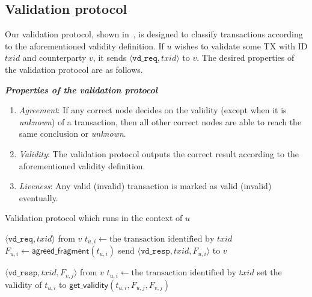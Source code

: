 \subsection{Validation protocol}
Our validation protocol,
shown in~,
is designed to classify transactions according to the aforementioned validity definition.
If $u$ wishes to validate some TX with ID $txid$ and counterparty $v$, it sends $\langle \texttt{vd\_req}, txid \rangle$ to $v$.
The desired properties of the validation protocol are as follows.
\begin{definition}
\label{def:validation}
\textbf{\emph{Properties of the validation protocol}}

\begin{enumerate}
    \item \emph{Agreement}:
        If any correct node decides on the validity (except when it is \emph{unknown}) of a transaction,
        then all other correct nodes are able to reach the same conclusion or \emph{unknown}.
    \item \emph{Validity}:
        The validation protocol outputs the correct result
        according to the aforementioned validity definition.
    \item \emph{Liveness}:
        Any valid (invalid) transaction is marked as valid (invalid) eventually.
\end{enumerate}
\end{definition}

\begin{algorithm}
\caption{Validation protocol which runs in the context of $u$}
\label{alg:vd-proto}

\begin{algorithmic}
    \Upon $\langle \texttt{vd\_req}, txid \rangle$ from $v$
        \State $t_{u, i} \gets \text{the transaction identified by } txid$
        \State $F_{u, i} \gets \textsf{agreed\_fragment}(t_{u, i})$
        \State send $\langle \texttt{vd\_resp}, txid, F_{u, i} \rangle$ to $v$

    \Upon $\langle \texttt{vd\_resp}, txid, F_{v, j} \rangle$ from $v$
        \State $t_{u, i} \gets \text{the transaction identified by } txid$
            \State set the validity of $t_{u, i}$ to $\textsf{get\_validity}(t_{u, i}, F_{u, j}, F_{v, j})$
        \EndIf
\end{algorithmic}
\end{algorithm}

